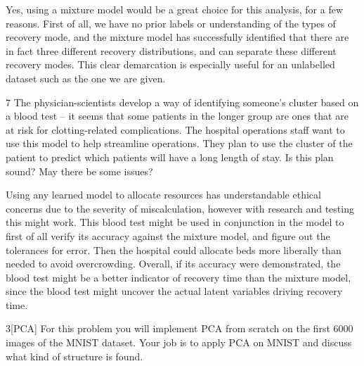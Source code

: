 \documentclass[expanded]{lkx_pset}
\begin{document}
\begin{parts}
	Yes, using a mixture model would be a great choice for this analysis, for a few reasons. First of all, we have no prior labels or understanding of the types of recovery mode, and the mixture model has successfully identified that there are in fact three different recovery distributions, and can separate these different recovery modes. This clear demarcation is especially useful for an unlabelled dataset such as the one we are given.

	\begin{part}{7} The physician-scientists develop a way of identifying someone's
		cluster based on a blood test -- it seems that some patients in the
		longer group are ones that are at risk for clotting-related
		complications.  The hospital operations staff want to use this model
		to help streamline operations.  They plan to use the cluster of the
		patient to predict which patients will have a long length of stay.
		Is this plan sound?  May there be some issues?
	\end{part}

	Using any learned model to allocate resources has understandable ethical concerns due to the severity of miscalculation, however with research and testing this might work. This blood test might be used in conjunction in the model to first of all verify its accuracy against the mixture model, and figure out the tolerances for error. Then the hospital could allocate beds more liberally than needed to avoid overcrowding. Overall, if its accuracy were demonstrated, the blood test might be a better indicator of recovery time than the mixture model, since the blood test might uncover the actual latent variables driving recovery time.
\end{parts}

\begin{problem}{3}[PCA]
For this problem you will implement PCA from scratch on the first 6000 images of the MNIST dataset. Your job is to apply PCA on MNIST and discuss what kind of structure is found.
\end{problem}
\end{document}
